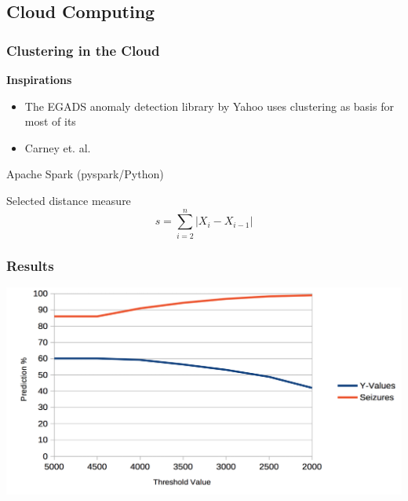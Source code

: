 \documentclass[xelatex,usenames,dvipsnames]{beamer}
\begin{document}
  \subsection{Cloud Computing}
  \begin{frame}
    \frametitle{Clustering in the Cloud}
    \textbf{Inspirations}
    \begin{itemize}
      \item The \textsc{EGADS} anomaly detection library by Yahoo\cite{egads} uses clustering as basis for most of its
      \item Carney et. al.\cite{Carney2011}
    \end{itemize}

    Apache Spark (pyspark/Python)
  
    \begin{exampleblock}{Selected distance measure}
      \begin{equation*}
        s = \sum_{i=2}^{n}{\left|X_i - X_{i-1}\right|}
      \end{equation*}
    \end{exampleblock}
  
  \end{frame}


  \begin{frame}[standout]
    \frametitle{Results}
  
    \includegraphics[width = \textwidth]{figs/Threshold.png}
    
  
  \end{frame}


\end{document}
